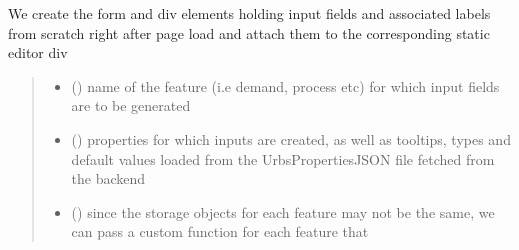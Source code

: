 \documentclass[letterpaper,10pt,english]{sphinxmanual}
\begin{document}
\begin{fulllineitems}
\label{\detokenize{docs_gui/js_api/urbs_editor/generate_urbs_setup_editor:populateUrbsEditor}}
\pysigstartsignatures
{}
\pysigstopsignatures
\sphinxAtStartPar
We create the form and div elements holding input fields and associated labels from scratch right after page load and attach them to the corresponding static
editor div
\begin{quote}\begin{description}
\begin{itemize}
\item {} 
\sphinxAtStartPar
{} () \textendash{} name of the feature (i.e demand, process etc) for which input fields are to be generated

\item {} 
\sphinxAtStartPar
{} () \textendash{} properties for which inputs are created, as well as tooltips, types and default values loaded from the UrbsPropertiesJSON file fetched from the backend

\item {} 
\sphinxAtStartPar
{} () \textendash{} since the storage objects for each feature may not be the same, we can pass a custom function for each feature that

\end{itemize}

\end{description}\end{quote}

\end{fulllineitems}

\end{document}
